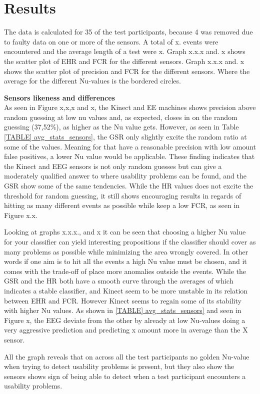 \section{Results}
The data is calculated for 35 of the test participants, because 4 was removed due to faulty data on one or more of the sensors.	
A total of x. events were encountered and the average length of a test were x.
Graph x.x.x and. x shows the scatter plot of EHR and FCR for the different sensors. 
Graph x.x.x and. x shows the scatter plot of precision and FCR for the different sensors. Where the average for the different Nu-values is the bordered circles.

\textbf{Sensors likeness and differences}\\
As seen in Figure x,x,x and x, the Kinect and EE machines shows precision above random guessing at low nu values and, as expected, closes in on the random guessing (37,52\%), as higher as the Nu value gets. However, as seen in Table \ref{TABLE] avg_stats_sensors}, the GSR only slightly excite the random ratio at some of the values. Meaning for  that have a reasonable precision with low amount false positives, a lower Nu value would be applicable.
These finding indicates that the Kinect and EEG sensors is not only random guesses but can give a moderately qualified answer to where usability problems can be found, and the GSR show some of the same tendencies.
While the HR values does not excite the threshold for random guessing, it still shows encouraging results in regards of hitting as many different events as possible while keep a low FCR, as seen in Figure x.x.

Looking at graphs x.x.x., and x it can be seen that choosing a higher Nu value for your classifier can yield interesting propositions if the classifier should cover as many problems as possible while minimizing the area wrongly covered.
In other words if one aim is to hit all the events a high Nu value must be chosen, and it comes with the trade-off of place more anomalies outside the events. 
While the GSR and the HR both have a smooth curve through the averages of which indicates a stable classifier, and Kinect seem to be more unstable in its relation between EHR and FCR. However Kinect seems to regain some of its stability with higher Nu values. As shown in \ref{TABLE] avg_stats_sensors} and seen in Figure x, the EEG deviate from the other by already at low Nu-values doing a very aggressive prediction and predicting x amount more in average than the X sensor.

All the graph reveals that on across all the test participants no golden Nu-value when trying to detect usability problems is present, but they also show the sensors shows sign of being able to detect when a test participant encounters a usability problems.
